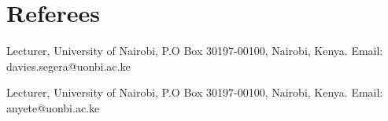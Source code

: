 \documentclass[11pt,a4paper]{moderncv}
\begin{document}
\section{Referees}

{Lecturer, University of Nairobi, P.O Box 30197-00100, Nairobi, Kenya. Email: davies.segera@uonbi.ac.ke}

{Lecturer, University of Nairobi, P.O Box 30197-00100, Nairobi, Kenya. Email: anyete@uonbi.ac.ke}
\end{document}
